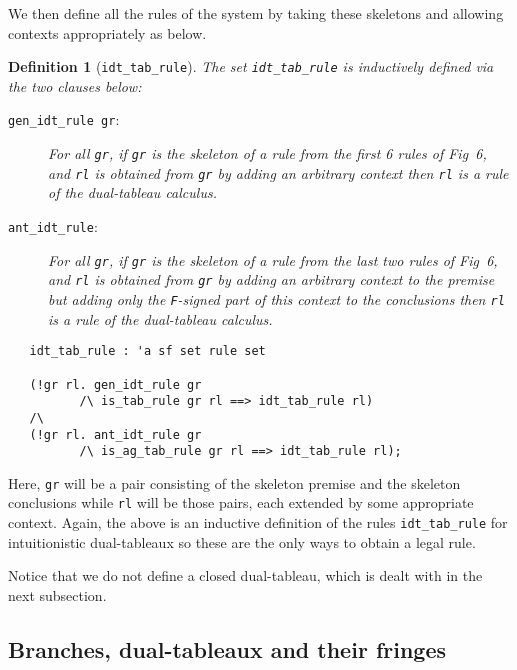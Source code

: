 \documentclass[a4paper]{article}
\newtheorem{definition}{Definition}
\begin{document}
We then define all the rules of the system by taking these skeletons
and allowing contexts appropriately as below.
\begin{definition}[\texttt{idt\_tab\_rule}]\label{idt-tab-rule}
  The set \texttt{idt\_tab\_rule} is inductively defined via the
  two clauses below:
  \begin{description}
  \item[\texttt{gen\_idt\_rule gr}:] For all \texttt{gr}, if
    \texttt{gr} is the skeleton of a rule from the first 6 rules of
    Fig~6, and \texttt{rl} is obtained from \texttt{gr} by adding an
    arbitrary context then \texttt{rl} is a rule of the dual-tableau
    calculus.
  \item[\texttt{ant\_idt\_rule}:] For all \texttt{gr}, if
    \texttt{gr} is the skeleton of a rule from the last two rules of
    Fig~6, and \texttt{rl} is obtained from \texttt{gr} by adding an
    arbitrary context to the premise but adding only the
    \texttt{F}-signed part of this context to the conclusions
    then \texttt{rl} is a rule of the dual-tableau
    calculus.
  \end{description}
\begin{verbatim}
   idt_tab_rule : 'a sf set rule set

   (!gr rl. gen_idt_rule gr 
          /\ is_tab_rule gr rl ==> idt_tab_rule rl) 
   /\
   (!gr rl. ant_idt_rule gr 
          /\ is_ag_tab_rule gr rl ==> idt_tab_rule rl);
\end{verbatim}
\end{definition}

Here, \texttt{gr} will be a pair consisting of the skeleton premise
and the skeleton conclusions while \texttt{rl} will be those pairs,
each extended by some appropriate context.
Again, the above is an inductive definition of the rules
\texttt{idt\_tab\_rule}
for
intuitionistic dual-tableaux so these are the only ways to obtain a
legal rule.

Notice that we do not define a closed dual-tableau,
which is dealt with in the next subsection.

\subsection{Branches, dual-tableaux and their fringes}
\end{document}
